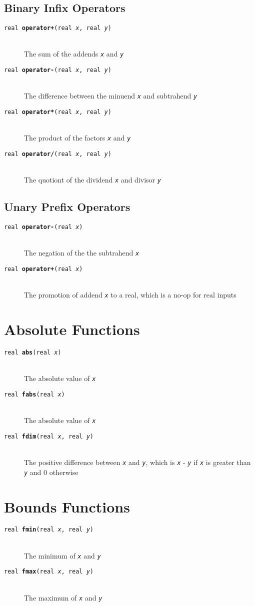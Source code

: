 \documentclass[10pt]{report}
\newcommand{\fitem}[4]{\item[{\tt #1 {\bfseries #2}(#3)}]\mbox{ } \\[4pt] #4}
\newcommand{\farg}[1]{{\tt\slshape #1}}
\begin{document}
\subsection{Binary Infix Operators}

\begin{description}
%
\fitem{real}{operator+}{real \farg{x}, real \farg{y}}{
The sum of the addends \farg{x} and \farg{y}}
%
\fitem{real}{operator-}{real \farg{x}, real \farg{y}}{
The difference between the minuend \farg{x} and subtrahend \farg{y}}
%
\fitem{real}{operator*}{real \farg{x}, real \farg{y}}{
The product of the factors \farg{x} and \farg{y}}
%
\fitem{real}{operator/}{real \farg{x}, real \farg{y}}{
The quotiont of the dividend \farg{x} and divisor \farg{y}}
%
\end{description}

\subsection{Unary Prefix Operators}

\begin{description}
\fitem{real}{operator-}{real \farg{x}}{
The negation of the the subtrahend \farg{x}}

\fitem{real}{operator+}{real \farg{x}}{
The promotion of addend \farg{x} to a real, which is a no-op
for real inputs}
\end{description}


\section{Absolute Functions}

\begin{description}
%
\fitem{real}{abs}{real \farg{x}}{
The absolute value of \farg{x}}
%
\fitem{real}{fabs}{real \farg{x}}{
The absolute value of \farg{x}}
%
\fitem{real}{fdim}{real \farg{x}, 
                 real \farg{y}}{
The positive difference between \farg{x} and \farg{y}, which is
\farg{x} - \farg{y} if \farg{x} is greater than \farg{y} and 0 otherwise}
%
\end{description}

\section{Bounds Functions}

\begin{description}
%
\fitem{real}{fmin}{real \farg{x}, real \farg{y}}{
The minimum of \farg{x} and \farg{y}}
%
\fitem{real}{fmax}{real \farg{x}, real \farg{y}}{
The maximum of \farg{x} and \farg{y}}
%
\end{description}
\end{document}
